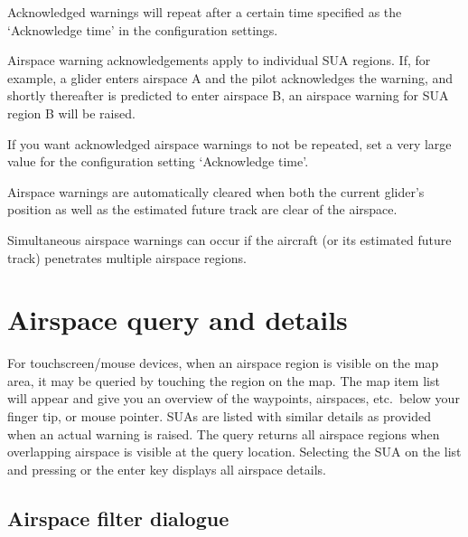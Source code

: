 Acknowledged warnings will repeat after a certain time specified as
the `Acknowledge time' in the configuration settings.

Airspace warning acknowledgements apply to individual SUA regions.
If, for example, a glider enters airspace A and the pilot acknowledges
the warning, and shortly thereafter is predicted to enter airspace B,
an airspace warning for SUA region B will be raised.

\tip If you want acknowledged airspace warnings to not be repeated,
set a very large value for the configuration setting `Acknowledge
time'.

Airspace warnings are automatically cleared when both the current
glider's position as well as the estimated future track are clear
of the airspace.

Simultaneous airspace warnings can occur if the aircraft (or its
estimated future track) penetrates multiple airspace regions.


\section{Airspace query and details}

For touchscreen/mouse devices, when an airspace region is visible on
the map area, it may be queried by touching the region on the map.  
The map item list will appear and give you an overview of the waypoints, 
airspaces, etc.\ below your finger tip, or mouse pointer.  SUAs are listed with
similar details as provided when an actual warning is raised.  
The query returns all airspace regions when overlapping airspace is visible at 
the query location.
Selecting the SUA on the list and pressing  or the enter key 
displays all airspace details. 



\subsection*{Airspace filter dialogue}\label{sec:airspace-filter}

